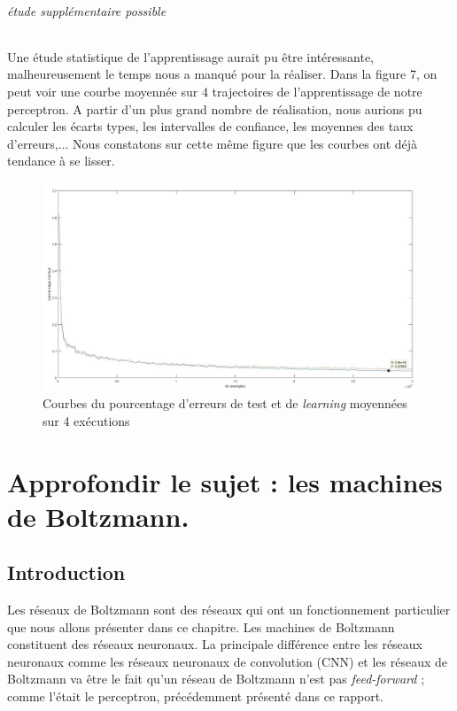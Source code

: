 \documentclass[a4paper,oneside]{report}
\begin{document}
\paragraph{étude supplémentaire possible}

Une étude statistique de l'apprentissage aurait pu être intéressante, malheureusement le temps nous a manqué pour la réaliser. Dans la figure 7, on peut voir une courbe moyennée sur 4 trajectoires de l'apprentissage de notre perceptron. A partir d'un plus grand nombre de réalisation, nous aurions pu calculer les écarts types, les intervalles de confiance, les moyennes des taux d'erreurs,... Nous constatons sur cette même figure que les courbes ont déjà tendance à se lisser.

\begin{figure}[!ht]
	\begin{center}
		\includegraphics[scale=0.27]{Images/courbes_moyennes.jpg} 
		\caption{Courbes du pourcentage d'erreurs de test et de \textit{learning} moyennées sur 4 exécutions} 
	\end{center}
\end{figure}






\newpage


    \part[Machines de Boltzmann]{Approfondir le sujet : les machines de Boltzmann.}

        \chapter{Introduction}

            Les réseaux de Boltzmann sont des réseaux qui ont un fonctionnement
            particulier que nous allons présenter dans ce chapitre. Les machines de
            Boltzmann constituent des réseaux neuronaux. La principale différence entre
            les réseaux neuronaux comme les réseaux neuronaux de convolution (CNN) et
            les  réseaux de Boltzmann va être le fait qu'un réseau de Boltzmann n'est
            pas \textit{feed-forward} ; comme l'était le perceptron, précédemment présenté dans ce
            rapport.
\end{document}
